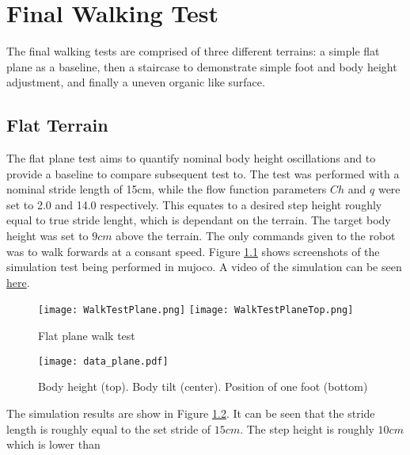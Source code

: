 \chapter{Final Walking Test}
    The final walking tests are comprised of three different terrains: a simple flat plane as a baseline, then a staircase to demonstrate simple foot and body height adjustment, and finally a uneven organic like surface.
    

    \section{Flat Terrain}
    The flat plane test aims to quantify nominal body height oscillations and to provide a baseline to compare subsequent test to. The test was performed with a nominal stride length of 15cm, while the flow function parameters \(Ch\) and \(q\) were set to 2.0 and 14.0 respectively. This equates to a desired step height roughly equal to true stride lenght, which is dependant on the terrain. The target body height was set to \(9cm\) above the terrain. The only commands given to the robot was to walk forwards at a consant speed. Figure \ref{fig:plane_test} shows screenshots of the simulation test being performed in \ac{mujoco}. A video of the simulation can be seen \hyperlink{}{here}.

    \newpage
    \begin{figure}[h]
        \centering
        \texttt{[image: WalkTestPlane.png]}
        \texttt{[image: WalkTestPlaneTop.png]}
        \caption{Flat plane walk test}
        \label{fig:plane_test}
    \end{figure}
    \begin{figure}[h]
        \centering
        \texttt{[image: data\_plane.pdf]}
        \caption{Body height (top). Body tilt (center). Position of one foot (bottom)}
        \label{fig:plane_test_data}
    \end{figure}
    
    \noindent
    The simulation results are show in Figure \ref{fig:plane_test_data}. It can be seen that the stride length is roughly equal to the set stride of \(15cm\). The step height is roughly \(10cm\) which is lower than 
    
